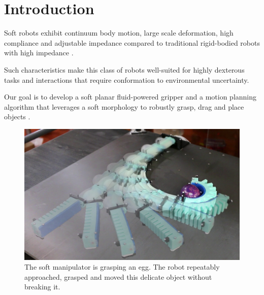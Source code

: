 \section{Introduction}

Soft robots exhibit continuum body motion, large scale deformation, high compliance and adjustable impedance  compared to traditional rigid-bodied robots with high impedance \cite{trivedi2008soft}. 

Such characteristics make this class of robots well-suited for highly dexterous tasks and interactions that require conformation to environmental uncertainty.

Our goal is to develop a soft planar fluid-powered gripper and a motion planning algorithm that leverages a soft morphology to robustly grasp, drag and place objects . 

\begin{figure}[htb]
\centering
   \includegraphics[width=0.99\columnwidth]{Figures/experimental_results/egg_approach/egg_approach_sequence_brighter}
   \caption{The soft manipulator is grasping an egg. The robot repeatably approached, grasped and moved this delicate object without breaking it.}
   \label{fig:egg_approach_sequence}
\end{figure}

